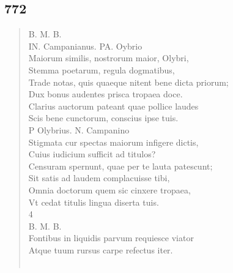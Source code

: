 \documentclass[11pt, a4paper]{report}
\begin{document}
            \subsection*{772}
      \begin{verse}
      B. M. B. \\ IN. Campanianus. PA. Oybrio \\ Maiorum similis, nostrorum maior, Olybri, \\ Stemma poetarum, regula dogmatibus, \\ Trade notas, quis quaeque nitent bene dicta priorum; \\ Dux bonus audentes prisca tropaea doce. \\ Clarius auctorum pateant quae pollice laudes \\ Scis bene cunctorum, conscius ipse tuis. \\ P Olybrius. N. Campanino \\ Stigmata cur spectas maiorum infigere dictis, \\ Cuius iudicium sufficit ad titulos? \\ Censuram spernunt, quae per te lauta patescunt; \\ Sit satis ad laudem complacuisse tibi, \\ Omnia doctorum quem sic cinxere tropaea, \\ Vt cedat titulis lingua diserta tuis. \\ 4 \\ B. M. B. \\ Fontibus in liquidis parvum requiesce viator \\ Atque tuum rursus carpe refectus iter. \\ 
        ﻿\pagebreak 
    
      \end{verse}
  
            \subsection*{}
      \begin{verse}
      \end{verse}
  
\end{document}
